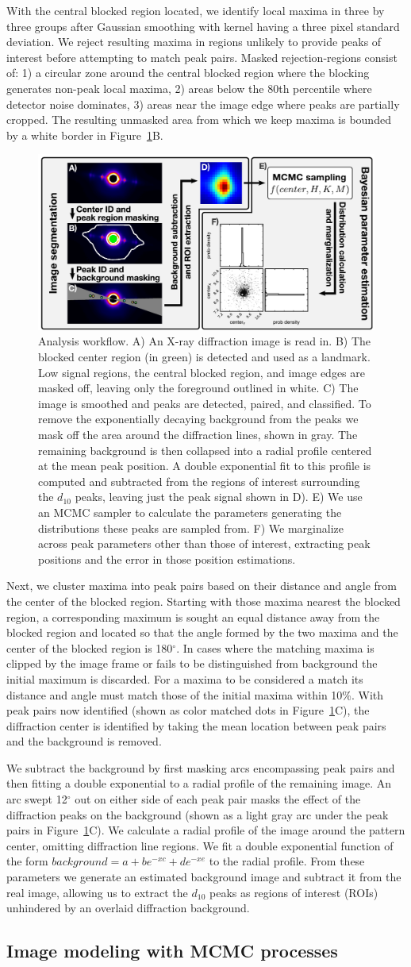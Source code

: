 \documentclass{llncs}
\newcommand{\figureworkflow}{
\begin{figure}[tbp]
  \centering
  \includegraphics[width=\linewidth]{figures/img_analysis}
  \caption{\label{fig:workflow}
  	Analysis workflow.
    A) An X-ray diffraction image is read in. B) The blocked center
    region (in green) is detected and used as a landmark.  Low signal
    regions, the central blocked region, and image edges are masked
    off, leaving only the foreground outlined in white. C) The image
    is smoothed and peaks are detected, paired, and classified. To
    remove the exponentially decaying background from the peaks we
    mask off the area around the diffraction lines, shown in gray. The
    remaining background is then collapsed into a radial profile
    centered at the mean peak position.  A double exponential fit to
    this profile is computed and subtracted from the regions of
    interest surrounding the $d_{10}$ peaks, leaving just the peak
    signal shown in D).  E) We use an MCMC sampler to calculate the
    parameters generating the distributions these peaks are sampled
    from. F) We marginalize across peak parameters other than those of
    interest, extracting peak positions and the error in those
    position estimations.  
	}
	\vspace{-10pt}
\end{figure}
}
\begin{document}
With the central blocked region located, we identify local maxima in
three by three groups after Gaussian smoothing with kernel having a
three pixel standard deviation. We reject resulting maxima in regions
unlikely to provide peaks of interest before attempting to match peak
pairs. Masked rejection-regions consist of: 1) a circular zone around
the central blocked region where the blocking generates non-peak local
maxima, 2) areas below the 80th percentile where detector noise
dominates, 3) areas near the image edge where peaks are partially
cropped. The resulting unmasked area from which we keep maxima is
bounded by a white border in Figure~\ref{fig:workflow}B.

\figureworkflow

Next, we cluster maxima into peak pairs based on their distance and
angle from the center of the blocked region. Starting with those
maxima nearest the blocked region, a corresponding maximum is sought
an equal distance away from the blocked region and located so that the
angle formed by the two maxima and the center of the blocked region is
180$^\circ$. In cases where the matching maxima is clipped by the
image frame or fails to be distinguished from background the initial
maximum is discarded. For a maxima to be considered a match its
distance and angle must match those of the initial maxima within 10\%.
With peak pairs now identified (shown as color matched dots in
Figure~\ref{fig:workflow}C), the diffraction center is identified by
taking the mean location between peak pairs and the background is
removed. 

We subtract the background by first masking arcs encompassing peak
pairs and then fitting a double exponential to a radial profile of the
remaining image. An arc swept 12$^\circ$ out on either side of each
peak pair masks the effect of the diffraction peaks on the background
(shown as a light gray arc under the peak pairs in
Figure~\ref{fig:workflow}C). We calculate a radial profile of the image
around the pattern center, omitting diffraction line regions. We fit a
double exponential function of the form $background = a+ b e^{-x c} +
d e^{-x e}$ to the radial profile. From these parameters we generate
an estimated background image and subtract it from the real image,
allowing us to extract the $d_{10}$ peaks as regions of interest (ROIs)
unhindered by an overlaid diffraction background.

\subsection{Image modeling with MCMC processes}
\label{subsec:modelmcmc}
\end{document}
